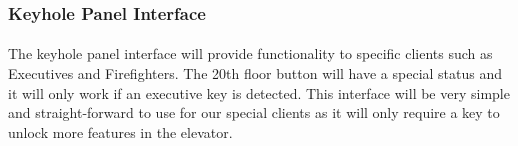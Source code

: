 \documentclass[12pt]{article}
\begin{document}
\subsubsection{Keyhole Panel Interface}
\paragraph{} The keyhole panel interface will provide functionality to specific clients such as Executives and Firefighters. The 20th floor button will have a special status and it will only work if an executive key is detected. This interface will be very simple and straight-forward to use for our special clients as it will only require a key to unlock more features in the elevator.


\end{document}
